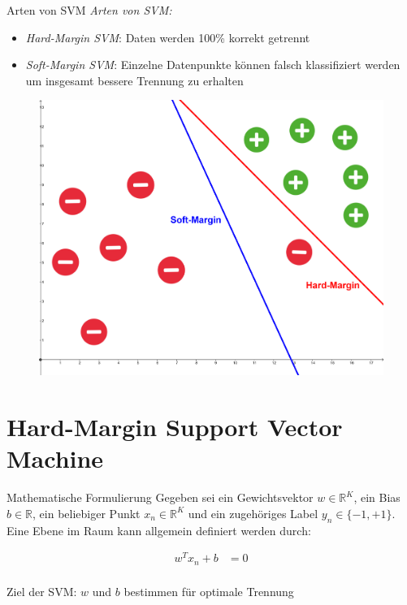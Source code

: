 \documentclass[ngerman]{beamer}
\begin{document}
\begin{frame}{Arten von SVM}
	\emph{Arten von SVM:}
	\begin{itemize}
		\item \emph{Hard-Margin SVM}: Daten werden 100\% korrekt getrennt
		\item \emph{Soft-Margin SVM}: Einzelne Datenpunkte können falsch klassifiziert werden um insgesamt bessere Trennung zu erhalten
	\end{itemize}

	\begin{center}
		\begin{figure}
			\includegraphics[width=\textwidth,height=0.6\textheight,keepaspectratio]{assets/hard_vs_soft_margin.png}
		\end{figure}
	\end{center}

\end{frame}

\section{Hard-Margin Support Vector Machine}


\begin{frame}{Mathematische Formulierung}
Gegeben sei ein Gewichtsvektor $w \in \mathbb{R}^{K}$, ein Bias $b \in \mathbb{R}$, ein beliebiger Punkt $x_{n} \in \mathbb{R}^{K}$ und ein zugehöriges Label $y_{n} \in \{-1, +1\}$. Eine Ebene im Raum kann allgemein definiert werden durch:

\begin{equation} \label{plane_eq}
	\begin{aligned}
		w^{T} x_{n} + b &= 0 \\
	\end{aligned}
\end{equation}

Ziel der SVM: $w$ und $b$ bestimmen für optimale Trennung

\end{frame}
\end{document}
